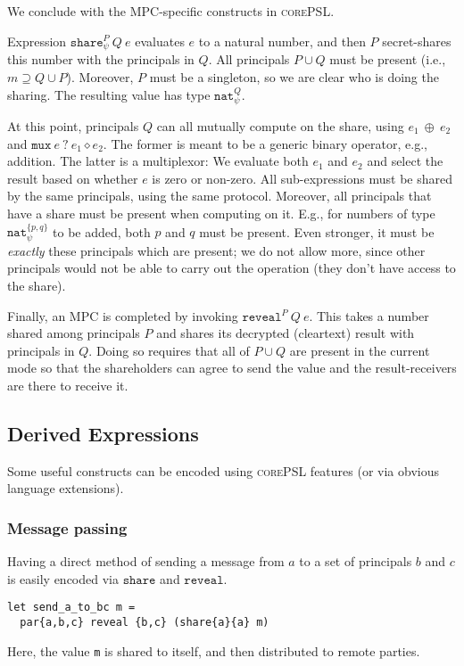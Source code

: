 \documentclass[10pt]{article}
\newcommand{\kw}[1]{\ensuremath{\mathtt{#1}}}
\newcommand{\tnat}{\ensuremath{\mathtt{nat}}}
\newcommand{\ebinop}[2]{\ensuremath{{#1}~\oplus~{#2}}}
\newcommand{\ereveal}[3]{\ensuremath{\kw{reveal}^{#1}~{#2}~{#3}}}
\newcommand{\emux}[3]{\ensuremath{\kw{mux}~{#1}~\kw{?}~{#2} \diamond {#3}}}
\newcommand{\eshare}[4]{\ensuremath{\kw{share}^{#2}_{#1}~{#3}~{#4}}}
\newcommand{\lang}{\textsc{corePSL}\xspace}
\begin{document}
We conclude with the MPC-specific constructs in \lang.

Expression $\eshare{\psi}{P}{Q}{e}$ evaluates $e$ to a natural number,
and then $P$ secret-shares this number with the principals in $Q$. All
principals $P \cup Q$ must be present (i.e.,
$m \supseteq Q \cup P$). Moreover, $P$ must be a singleton, so we
are clear who is doing the sharing. The resulting value has type
$\tnat^Q_\psi$.

At this point, principals $Q$ can all mutually compute on the share,
using $\ebinop{e_1}{e_2}$ and $\emux{e}{e_1}{e_2}$. The former is
meant to be a generic binary operator, e.g., addition. The latter is a
multiplexor: We evaluate both $e_1$ and $e_2$ and select the result
based on whether $e$ is zero or non-zero. All sub-expressions must be
shared by the same principals, using the same protocol. Moreover, all
principals that have a share must be present when computing on
it. E.g., for numbers of type $\tnat^{\{p,q\}}_\psi$ to be added, both
$p$ and $q$ must be present. Even stronger, it must be \emph{exactly}
these principals which are present; we do not allow more, since other
principals would not be able to carry out the operation (they don't
have access to the share).

Finally, an MPC is completed by invoking
$\ereveal{P}{Q}{e}$. This takes a number shared among principals
$P$ and shares its decrypted (cleartext) result with principals in
$Q$. Doing so requires that all of $P \cup Q$ are present in the
current mode so that the shareholders can agree to send the value and
the result-receivers are there to receive it.

\subsection{Derived Expressions}
\label{sec:derived}

Some useful constructs can be encoded using \lang features (or via
obvious language extensions). 

\subsubsection{Message passing}

Having a direct method of sending a message from $a$ to a set of
principals $b$ and $c$ is easily encoded via $\kw{share}$ and
$\kw{reveal}$. 
\begin{verbatim}
let send_a_to_bc m =
  par{a,b,c} reveal {b,c} (share{a}{a} m)
\end{verbatim}
Here, the value \texttt{m} is shared to itself, and then distributed
to remote parties.
\end{document}
